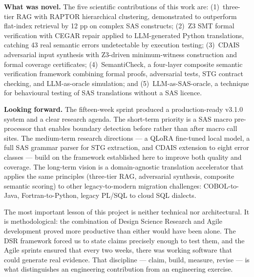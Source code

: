 \textbf{What was novel.} The five scientific contributions of this work are:
(1)~three-tier RAG with RAPTOR hierarchical clustering, demonstrated to
outperform flat-index retrieval by 12 pp on complex SAS constructs;
(2)~Z3 SMT formal verification with CEGAR repair applied to LLM-generated
Python translations, catching 43 real semantic errors undetectable by execution
testing; (3)~CDAIS adversarial input synthesis with Z3-driven minimum-witness
construction and formal coverage certificates; (4)~SemantiCheck, a four-layer
composite semantic verification framework combining formal proofs, adversarial
tests, STG contract checking, and LLM-as-oracle simulation; and (5)~LLM-as-SAS-oracle,
a technique for behavioural testing of SAS translations without a SAS licence.

\textbf{Looking forward.} The fifteen-week sprint produced a production-ready
v3.1.0 system and a clear research agenda. The short-term priority is a SAS
macro pre-processor that enables boundary detection before rather than after
macro call sites. The medium-term research directions --- a QLoRA fine-tuned
local model, a full SAS grammar parser for STG extraction, and CDAIS extension
to eight error classes --- build on the framework established here to improve
both quality and coverage. The long-term vision is a domain-agnostic translation
accelerator that applies the same principles (three-tier RAG, adversarial
synthesis, composite semantic scoring) to other legacy-to-modern migration
challenges: COBOL-to-Java, Fortran-to-Python, legacy PL/SQL to cloud SQL
dialects.

The most important lesson of this project is neither technical nor architectural.
It is methodological: the combination of Design Science Research and Agile
development proved more productive than either would have been alone. The DSR
framework forced us to state claims precisely enough to test them, and the Agile
sprints ensured that every two weeks, there was working software that could
generate real evidence. That discipline --- claim, build, measure, revise ---
is what distinguishes an engineering contribution from an engineering exercise.
